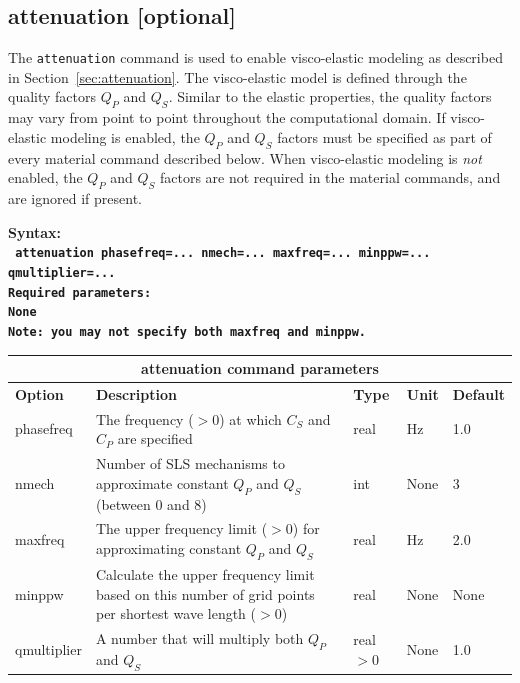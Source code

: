 \documentclass[11pt]{report}
\begin{document}
\subsection{attenuation [optional]}
\label{keyword:attenuation}

The \verb+attenuation+ command is used to enable visco-elastic modeling as described in
Section~\ref{sec:attenuation}. The visco-elastic model is defined through the quality factors $Q_P$
and $Q_S$. Similar to the elastic properties, the quality factors may vary from point to point
throughout the computational domain. If visco-elastic modeling is enabled, the $Q_P$ and $Q_S$
factors must be specified as part of every material command described below. When visco-elastic
modeling is {\em not} enabled, the $Q_P$ and $Q_S$ factors are not required in the material
commands, and are ignored if present.
\begin{flushleft}\bf
Syntax:\\
\tt
attenuation phasefreq=... nmech=... maxfreq=... minppw=... qmultiplier=...
\\
\bf Required parameters:\\
\rm None \\
\bf Note: \rm you may not specify both \verb+maxfreq+ and \verb+minppw+.
\end{flushleft}
%
\begin{center}
\begin{tabular}{|l|p{8cm}|l|l|l|} \hline
\multicolumn{5}{|c|}{\bf attenuation command parameters}\\ \hline
\bf{Option} & \bf{Description} & \bf{Type} & \bf{Unit} & \bf{Default} \\ \hline \hline
phasefreq & The frequency ($>0$) at which $C_S$ and $C_P$ are specified & real & Hz & 1.0\\ \hline
nmech     & Number of SLS mechanisms to approximate constant $Q_P$ and $Q_S$ (between 0 and 8) & int & None & 3\\ \hline
maxfreq   & The upper frequency limit  ($>0$) for approximating constant $Q_P$ and $Q_S$ & real & Hz & 2.0 \\ \hline
minppw    & Calculate the upper frequency limit based on this number of grid points per shortest
wave length ($>0$)& real & None & None \\ \hline
qmultiplier & A number that will multiply both $Q_P$ and $Q_S$ & real$>0$  & None & 1.0 \\ \hline
\end{tabular}
\end{center}
\end{document}
